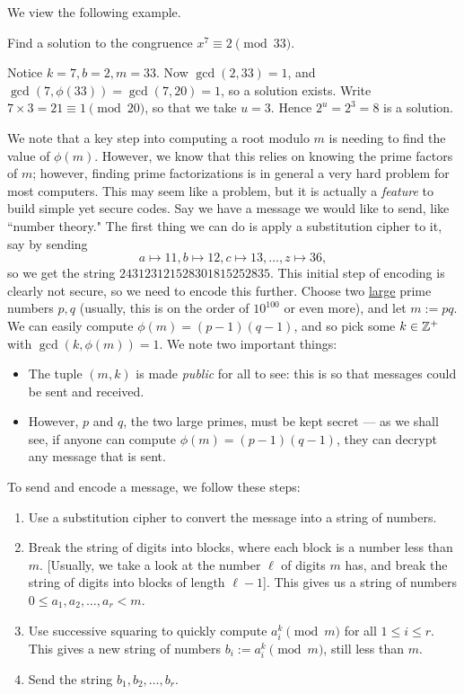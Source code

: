 \documentclass{article}
\begin{document}
We view the following example.
\begin{example}
Find a solution to the congruence $x^7 \equiv 2\pmod{33}$.
\end{example}
\begin{solution}
Notice $k=7, b=2, m=33$. Now $\gcd(2, 33) = 1$, and $\gcd(7, \phi(33)) = \gcd(7, 20) = 1$, so a solution exists. Write $7\times 3 = 21 \equiv 1\pmod{20}$, so that we take $u=3$. Hence $2^u = 2^3 = \boxed 8$ is a solution.
\end{solution}

We note that a key step into computing a root modulo $m$ is needing to find the value of $\phi(m)$. However, we know that this relies on knowing the prime factors of $m$; however, finding prime factorizations is in general a very hard problem for most computers. This may seem like a problem, but it is actually a \textit{feature} to build simple yet secure codes. Say we have a message we would like to send, like ``number theory." The first thing we can do is apply a substitution cipher to it, say by sending
$$a\mapsto 11, b\mapsto 12, c\mapsto 13,\ldots, z\mapsto 36,$$
so we get the string $243123121528301815252835$. This initial step of encoding is clearly not secure, so we need to encode this further. Choose two \underline{large} prime numbers $p,q$ (usually, this is on the order of $10^{100}$ or even more), and let $m := pq$. We can easily compute $\phi(m) = (p-1)(q-1)$, and so pick some $k\in\mathbb Z^+$ with $\gcd(k, \phi(m)) = 1$. We note two important things:
\begin{itemize}
    \item The tuple $(m, k)$ is made \textit{public} for all to see: this is so that messages could be sent and received.
    \item However, $p$ and $q$, the two large primes, must be kept secret --- as we shall see, if anyone can compute $\phi(m) = (p-1)(q-1)$, they can decrypt any message that is sent.
\end{itemize}
\newpage
To send and encode a message, we follow these steps:
\begin{enumerate}
    \item Use a substitution cipher to convert the message into a string of numbers.
    \item Break the string of digits into blocks, where each block is a number less than $m$. [Usually, we take a look at the number $\ell$ of digits $m$ has, and break the string of digits into blocks of length $\ell - 1$]. This gives us a string of numbers $0\leq a_1, a_2, \ldots, a_r < m$.
    \item Use successive squaring to quickly compute $a_i^k \pmod m$ for all $1\leq i \leq r$. This gives a new string of numbers $b_i := a_i^k \pmod m$, still less than $m$.
    \item Send the string $b_1, b_2, \ldots, b_r$.
\end{enumerate}
\end{document}
